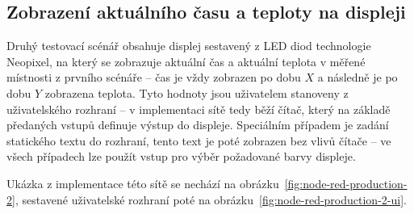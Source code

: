 \subsection{Zobrazení aktuálního času a teploty na displeji}\label{subsec:scenar-2}

Druhý testovací scénář obsahuje displej sestavený z LED diod technologie Neopixel, na který se zobrazuje aktuální čas
a aktuální teplota v měřené místnosti z prvního scénáře -- čas je vždy zobrazen po dobu $X$ a následně je po dobu $Y$
zobrazena teplota.
Tyto hodnoty jsou uživatelem stanoveny z uživatelského rozhraní -- v implementaci sítě tedy běží čítač, který na
základě předaných vstupů definuje výstup do displeje.
Speciálním případem je zadání statického textu do rozhraní, tento text je poté zobrazen bez vlivů čítače -- ve všech
případech lze použít vstup pro výběr požadované barvy displeje.

Ukázka z implementace této sítě se nechází na obrázku~\ref{fig:node-red-production-2}, sestavené uživatelské rozhraní
poté na obrázku~\ref{fig:node-red-production-2-ui}.

